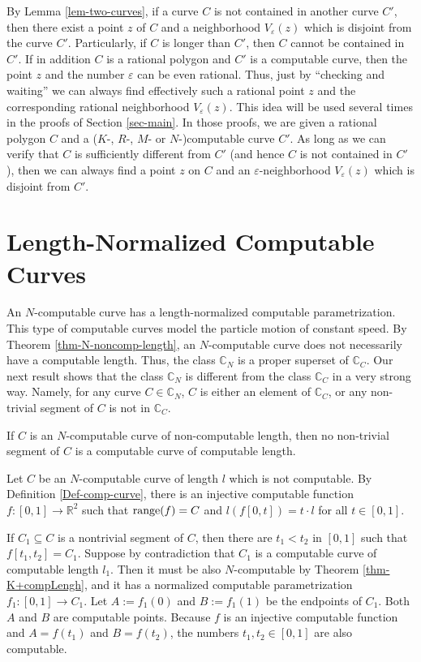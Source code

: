 \documentclass{LMCS}
\theoremstyle{plain}
\def\IC{\mathbb{C}}
\def\IR{\mathbb{R}}
\newcommand{\rang}{\mbox{\rm range}}
\begin{document}
By Lemma \ref{lem-two-curves}, if a curve $C$ is not contained in another curve $C'$, then there exist a point $z$ of $C$ and a neighborhood $V_\varepsilon(z)$ which is disjoint from the curve $C'$. Particularly, if $C$ is longer than $C'$, then $C$ cannot be contained in $C'$. If in addition $C$ is a rational polygon and $C'$ is a computable curve, then the point $z$ and the number $\varepsilon$ can be even rational. Thus, just by ``checking and waiting'' we can always find effectively such a rational point $z$ and the corresponding rational neighborhood $V_\varepsilon(z)$. This idea will be used several times in the proofs of Section \ref{sec-main}. In those proofs, we are given a rational polygon $C$ and a ($K$-, $R$-, $M$- or $N$-)computable curve $C'$. As long as we can verify that $C$ is sufficiently different from $C'$ (and hence $C$ is not contained in $C'$), then we can always find a point $z$ on $C$ and an $\varepsilon$-neighborhood $V_\varepsilon(z)$ which is disjoint from $C'$.



\section{Length-Normalized Computable Curves}\label{sec-n-comp-curve}

An $N$-computable curve has a length-normalized computable parametrization. This type of computable curves model the particle motion of constant speed. By Theorem \ref{thm-N-noncomp-length}, an $N$-computable curve does not necessarily have a computable length. Thus, the class $\IC_N$ is a proper superset of $\IC_C$. Our next result shows that the class $\IC_N$ is different from the class $\IC_C$ in a very strong way. Namely, for any curve $C \in \IC_N$, $C$ is either an element of $\IC_C$, or any non-trivial segment of $C$ is not in $\IC_C$.

\begin{lem}\label{lem-N-C-no-containing}
If $C$ is an $N$-computable curve of non-computable length, then no non-trivial segment of $C$ is a computable curve of computable length.
\end{lem}
\proof
Let $C$ be an $N$-computable curve of length $l$ which is not computable. By Definition \ref{Def-comp-curve}, there is an injective computable function $f:[0,1] \to \IR^2$ such that $\rang(f) =C$ and $l(f[0,t]) = t\cdot l$ for all $t \in [0,1]$.

If $C_1\subseteq C$ is a nontrivial segment of $C$, then there are $t_1 < t_2$ in $[0,1]$ such that $f[t_1, t_2] =C_1$. Suppose by contradiction that $C_1$ is a computable curve of computable length $l_1$. Then it must be also $N$-computable by Theorem \ref{thm-K+compLengh}, and it has a normalized computable parametrization $f_1:[0,1]\to C_1$. Let $A:=f_1(0)$ and $B:=f_1(1)$ be the endpoints of $C_1$. Both $A$ and $B$ are computable points. Because $f$ is an injective computable function and $A=f(t_1)$ and $B=f(t_2)$, the numbers $t_1, t_2 \in [0,1]$ are also computable.
\end{document}
